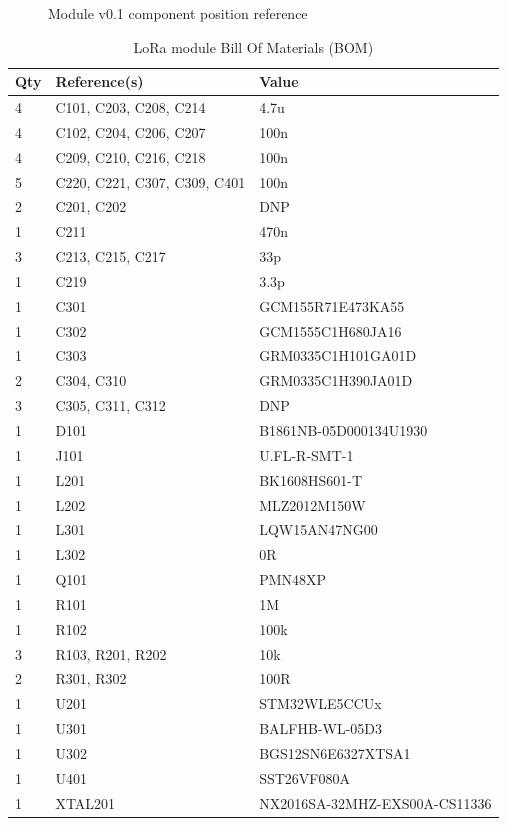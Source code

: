 \begin{figure}
    
    \caption{\label{board:v0.1-components}Module v0.1 component position reference}
\end{figure}

\begin{table}
\begin{center}
\caption{\label{table:module-bom}LoRa module Bill Of Materials (BOM)}
\begin{tabular}{|l|l|l|} \hline
    \textbf{Qty} &	\textbf{Reference(s)} &	\textbf{Value} \\ \hline
    4   & C101, C203, C208, C214 & 4.7u \\ \hline
    4  & C102, C204, C206, C207 & 100n \\ \hline
    4  & C209, C210, C216, C218 & 100n \\ \hline
    5  & C220, C221, C307, C309, C401 & 100n \\ \hline
    2   & C201, C202 & DNP \\ \hline
    1   & C211 & 470n \\ \hline
    3   & C213, C215, C217 &	33p \\ \hline
    1   & C219	& 3.3p \\ \hline
    1   & C301	& GCM155R71E473KA55 \\ \hline
    1   & C302	& GCM1555C1H680JA16 \\ \hline
    1   & C303	& GRM0335C1H101GA01D \\ \hline
    2   & C304, C310	& GRM0335C1H390JA01D \\ \hline
    3   & C305, C311, C312	& DNP \\ \hline
    1   & D101	& B1861NB-05D000134U1930 \\ \hline
    1   & J101	& U.FL-R-SMT-1 \\ \hline
    1   & L201	& BK1608HS601-T \\ \hline
    1   & L202	& MLZ2012M150W \\ \hline
    1   & L301	& LQW15AN47NG00 \\ \hline
    1   & L302	& 0R \\ \hline
    1   & Q101	& PMN48XP \\ \hline
    1   & R101	& 1M \\ \hline
    1   & R102	& 100k \\ \hline
    3   & R103, R201, R202	& 10k \\ \hline
    2   & R301, R302	& 100R \\ \hline
    1   & U201	& STM32WLE5CCUx \\ \hline
    1   & U301	& BALFHB-WL-05D3 \\ \hline
    1   & U302	& BGS12SN6E6327XTSA1 \\ \hline
    1   & U401	& SST26VF080A \\ \hline
    1   & XTAL201 &	NX2016SA-32MHZ-EXS00A-CS11336 \\ \hline
\end{tabular}
\end{center}
\end{table}
